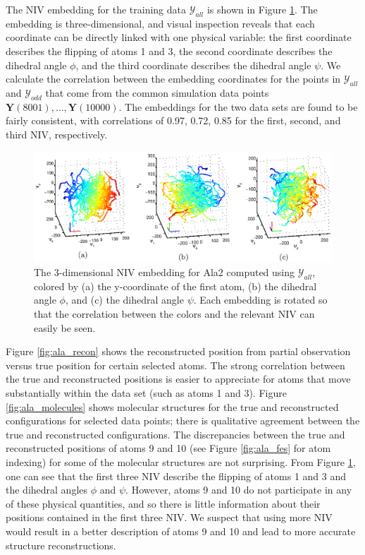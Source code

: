The NIV embedding for the training data $\mathcal{Y}_{all}$ is shown in Figure \ref{fig:ala_embed}.
%
The embedding is three-dimensional, and visual inspection reveals that each coordinate can be directly linked with one physical variable:
the first coordinate describes the flipping of atoms 1 and 3, the second coordinate describes the dihedral angle $\phi$, and the third coordinate describes the dihedral angle $\psi$.
%
We calculate the correlation between the embedding coordinates for the points in $\mathcal{Y}_{all}$ and $\mathcal{Y}_{odd}$
that come from the common simulation data points $\mathbf{Y}(8001), \dots, \mathbf{Y}(10000)$.
%
The embeddings for the two data sets are found to be fairly consistent, with correlations of 0.97, 0.72, 0.85 for the first, second, and third NIV, respectively.

\begin{figure}[t]
    \includegraphics[width=6in]{fig8}
    \caption[Intrinsic variable embedding for alanine dipeptide data]{The 3-dimensional NIV embedding for Ala2 computed using $\mathcal{Y}_{all}$, colored by (a) the y-coordinate of the first atom, (b) the dihedral angle $\phi$, and (c) the dihedral angle $\psi$. Each embedding is rotated so that the correlation between the colors and the relevant NIV can easily be seen.}
    \label{fig:ala_embed}
\end{figure}


Figure \ref{fig:ala_recon} shows the reconstructed position from partial observation versus true position for certain selected atoms.
%
The strong correlation between the true and reconstructed positions is easier to appreciate for
atoms that move substantially within the data set (such as atoms 1 and 3).
%
Figure \ref{fig:ala_molecules} shows molecular structures for the true and reconstructed configurations for selected data points;
there is qualitative agreement between the true and reconstructed configurations.
%
The discrepancies between the true and reconstructed positions of atoms 9 and 10 (see Figure \ref{fig:ala_fes} for atom indexing) for some of the molecular structures are not surprising.
%
From Figure \ref{fig:ala_embed}, one can see that the first three NIV describe the flipping of atoms 1 and 3 and the dihedral angles $\phi$ and $\psi$.
%
However, atoms 9 and 10 do not participate in any of these physical quantities, and so there is little information about their positions contained in the first three NIV.
%
We suspect that using more NIV would result in a better description of atoms 9 and 10 and lead to more accurate structure reconstructions.

